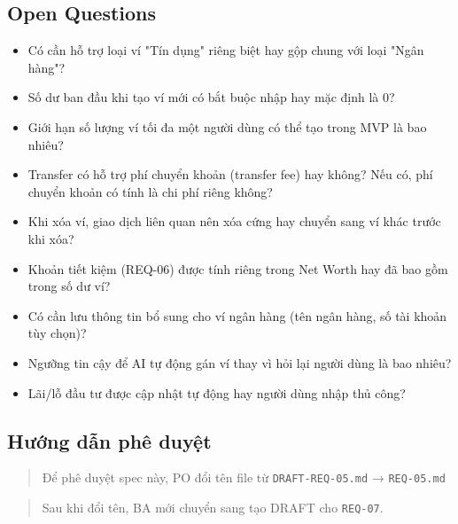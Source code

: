 \subsection{Open Questions}

\begin{itemize}
\item [ ] Có cần hỗ trợ loại ví "Tín dụng" riêng biệt hay gộp chung với loại "Ngân hàng"?
\item [ ] Số dư ban đầu khi tạo ví mới có bắt buộc nhập hay mặc định là 0?
\item [ ] Giới hạn số lượng ví tối đa một người dùng có thể tạo trong MVP là bao nhiêu?
\item [ ] Transfer có hỗ trợ phí chuyển khoản (transfer fee) hay không? Nếu có, phí chuyển khoản có tính là chi phí riêng không?
\item [ ] Khi xóa ví, giao dịch liên quan nên xóa cứng hay chuyển sang ví khác trước khi xóa?
\item [ ] Khoản tiết kiệm (REQ-06) được tính riêng trong Net Worth hay đã bao gồm trong số dư ví?
\item [ ] Có cần lưu thông tin bổ sung cho ví ngân hàng (tên ngân hàng, số tài khoản tùy chọn)?
\item [ ] Ngưỡng tin cậy để AI tự động gán ví thay vì hỏi lại người dùng là bao nhiêu?
\item [ ] Lãi/lỗ đầu tư được cập nhật tự động hay người dùng nhập thủ công?
\end{itemize}
\subsection{Hướng dẫn phê duyệt}

\begin{quote}
Để phê duyệt spec này, PO đổi tên file từ \texttt{DRAFT-REQ-05.md} → \texttt{REQ-05.md}
\end{quote}

\begin{quote}
Sau khi đổi tên, BA mới chuyển sang tạo DRAFT cho \texttt{REQ-07}.
\end{quote}
